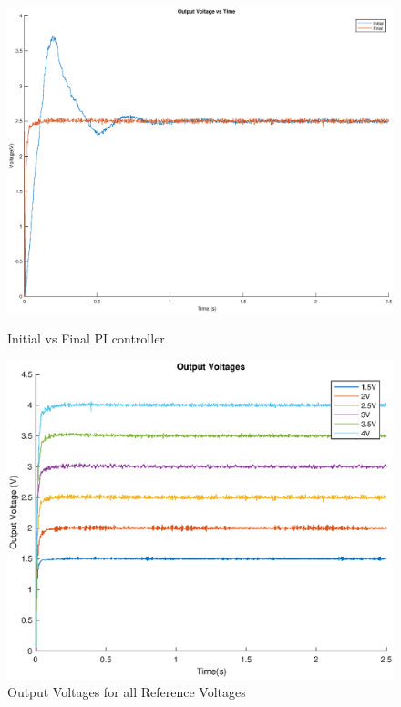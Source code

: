 \documentclass[a4paper]{article}
\begin{document}
\begin{figure}[H]
    \centering
    \begin{minipage}{.4\textwidth}
        \centering
        \includegraphics[scale=0.178]{./media/initialvsfinal.eps}
        \caption{Initial vs Final PI controller}
        \label{graph:Initial vs Final PI controller}
    \end{minipage}%
    \begin{minipage}{.6\textwidth}
        \centering
        \includegraphics[scale=0.35]{./media/allvoltages.eps}
        \caption{Output Voltages for all Reference Voltages }
        \label{graph:Output Voltages}
    \end{minipage}
\end{figure}
\end{document}
